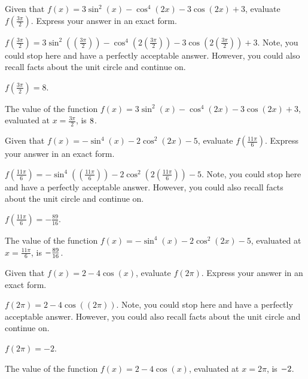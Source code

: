 \begin{shuffle}
\begin{exercise}
Given that $f(x)=3 \sin ^2(x)-\cos ^4(2 x)-3 \cos (2 x)+3$, evaluate $f\left(\frac{3 \pi }{2}\right)$. Express your answer in an exact form.
\begin{solution}
\begin{hint}
$f\left(\frac{3 \pi }{2}\right)=3 \sin ^2(\left(\frac{3 \pi }{2}\right))-\cos ^4(2 \left(\frac{3 \pi }{2}\right))-3 \cos (2 \left(\frac{3 \pi }{2}\right))+3$. Note, you could stop here and have a perfectly acceptable answer. However, you could also recall facts about the unit circle and continue on. 
\end{hint}
\begin{hint}
$f\left(\frac{3 \pi }{2}\right)=8$.
\end{hint}
The value of the function $f(x) = 3 \sin ^2(x)-\cos ^4(2 x)-3 \cos (2 x)+3$, evaluated at $x=\frac{3 \pi }{2}$, is ${8}$.
\end{solution}
\end{exercise}

\begin{exercise}
Given that $f(x)=-\sin ^4(x)-2 \cos ^2(2 x)-5$, evaluate $f\left(\frac{11 \pi }{6}\right)$. Express your answer in an exact form.
\begin{solution}
\begin{hint}
$f\left(\frac{11 \pi }{6}\right)=-\sin ^4(\left(\frac{11 \pi }{6}\right))-2 \cos ^2(2 \left(\frac{11 \pi }{6}\right))-5$. Note, you could stop here and have a perfectly acceptable answer. However, you could also recall facts about the unit circle and continue on. 
\end{hint}
\begin{hint}
$f\left(\frac{11 \pi }{6}\right)=-\frac{89}{16}$.
\end{hint}
The value of the function $f(x) = -\sin ^4(x)-2 \cos ^2(2 x)-5$, evaluated at $x=\frac{11 \pi }{6}$, is ${-\frac{89}{16}}$.
\end{solution}
\end{exercise}

\begin{exercise}
Given that $f(x)=2-4 \cos (x)$, evaluate $f\left(2 \pi\right)$. Express your answer in an exact form.
\begin{solution}
\begin{hint}
$f\left(2 \pi\right)=2-4 \cos (\left(2 \pi\right))$. Note, you could stop here and have a perfectly acceptable answer. However, you could also recall facts about the unit circle and continue on. 
\end{hint}
\begin{hint}
$f\left(2 \pi\right)=-2$.
\end{hint}
The value of the function $f(x) = 2-4 \cos (x)$, evaluated at $x=2 \pi$, is ${-2}$.
\end{solution}
\end{exercise}


\end{shuffle}
